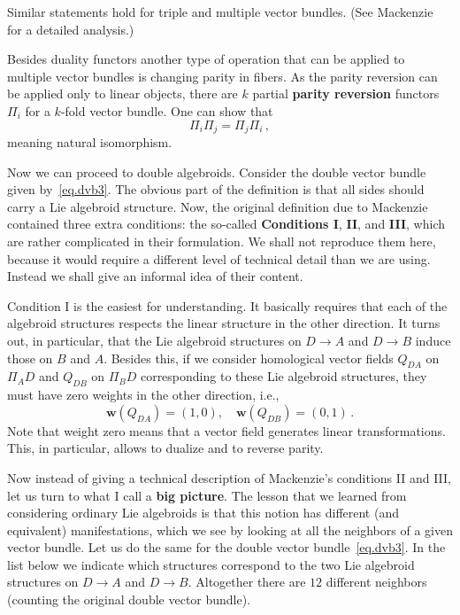 \documentclass[12pt,reqno,a4paper]{amsart}
\theoremstyle{definition}
\begin{document}
Similar statements hold  for triple and multiple vector bundles. (See Mackenzie~\cite{mackenzie:duality} for a detailed analysis.)

Besides duality functors another type of operation that can be applied to multiple vector bundles is changing parity in fibers. As the parity reversion  can be applied only to linear objects, there are $k$ partial \textbf{parity reversion} functors $\Pi_i$ for a $k$-fold vector bundle. One can show that
\begin{equation*}
    \Pi_i\Pi_j=\Pi_j\Pi_i\,,
\end{equation*}
meaning natural isomorphism.

Now we can proceed to double algebroids. Consider the double vector bundle given by~\eqref{eq.dvb3}. The obvious part of the definition is that all sides should carry a Lie algebroid structure. Now, the original definition due to Mackenzie contained three extra conditions: the so-called \textbf{Conditions I}, \textbf{II}, and \textbf{III}, which are rather complicated in their formulation. We shall not reproduce them here, because it would require a different level of technical detail than we are using. Instead we shall give an informal idea of their content.

Condition I is the easiest for understanding. It basically requires
that each of the algebroid structures respects the linear structure
in the other direction. It turns out, in particular, that the Lie
algebroid structures on $D\to A$ and $D\to B$ induce those on $B$
and $A$. Besides this, if we consider homological vector fields
$Q_{DA}$ on $\Pi_AD$ and $Q_{DB}$ on $\Pi_BD$ corresponding to these
Lie algebroid structures, they must have zero weights in the other
direction, i.e.,
\begin{equation*}
    {{\boldsymbol{w}}}(Q_{DA})=(1,0), \quad {{\boldsymbol{w}}}(Q_{DB})=(0,1)\,.
\end{equation*}
Note that weight zero means that a vector field generates linear transformations. This, in particular, allows to dualize and to reverse parity.

Now instead of giving a technical description of Mackenzie's conditions II and III, let us turn to what I call a \textbf{big picture}. The lesson that we learned from considering ordinary Lie algebroids is that this notion has different (and equivalent) manifestations, which we see by looking at all the neighbors of a given vector bundle. Let us do the same for the double vector bundle~\eqref{eq.dvb3}. In the list below we indicate which structures correspond to the two Lie algebroid structures on $D\to A$ and $D\to B$. Altogether there are $12$ different neighbors (counting the original double vector bundle).
\end{document}
